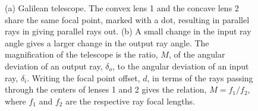 \begin{figure}[t]
\centerline{
 }
\centerline{
}
\caption{(a) Galilean telescope. The convex lens 1 and the concave lens 2 share the same focal point, marked with a dot, resulting in parallel rays in giving parallel rays out. (b) A small change in the input ray angle gives a larger change in the output ray angle. The magnification of the telescope is the ratio, $M$, of the angular deviation of an output ray, $\delta_o$, to the angular deviation of an input ray, $\delta_i$.  Writing the focal point offset, $d$, in terms of the rays passing through the centers of lenses 1 and 2 gives the relation, $M = f_1/f_2$, where $f_1$ and $f_2$ are the respective ray focal lengths.}
\label{fig:telescope}
\end{figure}

